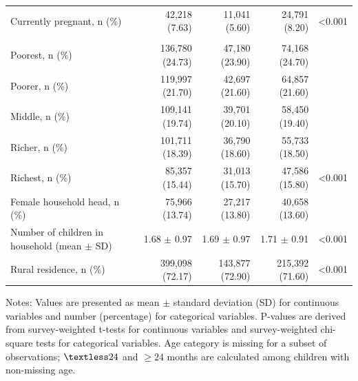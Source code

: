 \begin{table}[ht]
\begin{threeparttable}
\begin{tabularx}{\textwidth}{
@{}>{\raggedright\arraybackslash}X 
r 
r 
r 
>{\raggedleft\arraybackslash}p{1.2cm}@{}}
Currently pregnant, n (\%)
& 42{,}218 (7.63)
& 11{,}041 (5.60)
& 24{,}791 (8.20)
& \textless0.001 \\

\addlinespace[4pt]
\multicolumn{5}{l}{\textbf{Household characteristics}} \\

Poorest, n (\%)
& 136{,}780 (24.73)
& 47{,}180 (23.90)
& 74{,}168 (24.70)
&  \\

Poorer, n (\%)
& 119{,}997 (21.70)
& 42{,}697 (21.60)
& 64{,}857 (21.60)
&  \\

Middle, n (\%)
& 109{,}141 (19.74)
& 39{,}701 (20.10)
& 58{,}450 (19.40)
&  \\

Richer, n (\%)
& 101{,}711 (18.39)
& 36{,}790 (18.60)
& 55{,}733 (18.50)
&  \\

Richest, n (\%)
& 85{,}357 (15.44)
& 31{,}013 (15.70)
& 47{,}586 (15.80)
& \textless0.001 \\

Female household head, n (\%)
& 75{,}966 (13.74)
& 27{,}217 (13.80)
& 40{,}658 (13.60)
& 0.024 \\

Number of children in household (mean $\pm$ SD)
& 1.68 $\pm$ 0.97
& 1.69 $\pm$ 0.97
& 1.71 $\pm$ 0.91
& \textless0.001 \\

Rural residence, n (\%)
& 399{,}098 (72.17)
& 143{,}877 (72.90)
& 215{,}392 (71.60)
& \textless0.001 \\

\bottomrule
\end{tabularx}

\begin{tablenotes}[flushleft]
\footnotesize
\item Notes: Values are presented as mean $\pm$ standard deviation (SD) for continuous variables and number (percentage) for categorical variables. P-values are derived from survey-weighted t-tests for continuous variables and survey-weighted chi-square tests for categorical variables. Age category is missing for a subset of observations; $\textless24$ and $\geq24$ months are calculated among children with non-missing age.
\end{tablenotes}

\end{threeparttable}
\end{table}